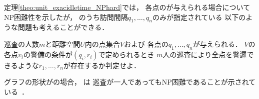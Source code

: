 定理\ref{theo:unit_exacidletime_NPhard}では，
各点の{\exactIdletime}が与えられる場合についてNP困難性を示したが，
{\exactIdletime}のうち訪問間隔$q_1, \ldots, q_n$のみが指定されている
以下のような問題も考えることができる．

\begin{intervalSpecifiedPatrollingProblemDecision}
巡査の人数$m$と距離空間$U$内の点集合$V$および
各点の{\exactInterval}$q_1, \ldots, q_n$が与えられる．
$V$の各点$v_i$の警備の条件が{\exactIdletime}$(q_i, r_i)$で定められるとき
$m$人の巡査により全点を警邏できるような$r_1, \ldots, r_n$が存在するか判定せよ．
\end{intervalSpecifiedPatrollingProblemDecision}

グラフの形状が{\graphUnit}の場合，
{\intervalSpecifiedPatProbDecision}は
巡査が一人であってもNP困難であることが示されている~\cite{kawamura2015simple}．




